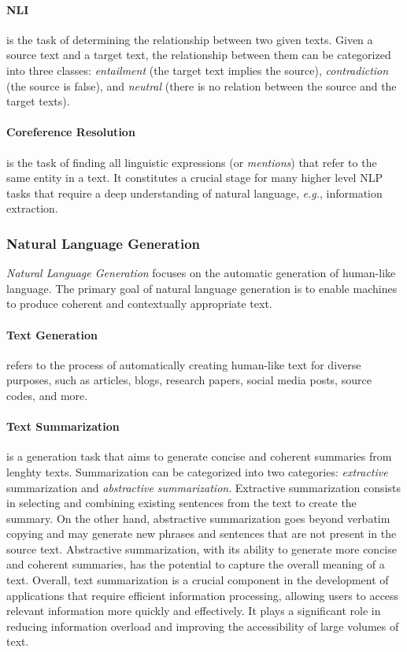 \paragraph{\ac{NLI}} is the task of determining the relationship between two given texts. Given a source text and a target text, the relationship between them can be categorized into three classes: \textit{entailment} (the target text implies the source), \textit{contradiction} (the source is false), and \textit{neutral} (there is no relation between the source and the target texts).

\paragraph{Coreference Resolution} is the task of finding all linguistic expressions (or \textit {mentions}) that refer to the same entity in a text. It constitutes a crucial stage for many higher level \ac{NLP} tasks that require a deep understanding of natural language, \textit{e.g.}, information extraction.

\subsubsection{Natural Language Generation} 

\textit{Natural Language Generation} focuses on the automatic generation of human-like language. The primary goal of natural language generation is to enable machines to produce coherent and contextually appropriate text.

\paragraph{Text Generation} refers to the process of automatically creating human-like text for diverse purposes, such as articles, blogs, research papers, social media posts, source codes, and more.

\paragraph{Text Summarization} is a generation task that aims to generate concise and coherent summaries from lenghty texts. Summarization can be categorized into two categories: \textit{extractive} summarization and \textit{abstractive summarization}. Extractive summarization consists in selecting and combining existing sentences from the text to create the summary. On the other hand, abstractive summarization goes beyond verbatim copying and may generate new phrases and sentences that are not present in the source text. Abstractive summarization, with its ability to generate more concise and coherent summaries, has the potential to capture the overall meaning of a text. Overall, text summarization is a crucial component in the development of applications that require efficient information processing, allowing users to access relevant information more quickly and effectively. It plays a significant role in reducing information overload and improving the accessibility of large volumes of text.

